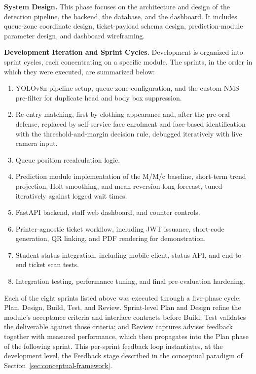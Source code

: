 \documentclass{research}
\begin{document}
\textbf{System Design.} This phase focuses on the architecture and
design of the detection pipeline, the backend, the database, and the
dashboard. It includes queue-zone coordinate design, ticket-payload
schema design, prediction-module parameter design, and dashboard
wireframing.

\textbf{Development Iteration and Sprint Cycles.} Development is
organized into sprint cycles, each concentrating on a specific module.
The sprints, in the order in which they were executed, are
summarized below:
\begin{enumerate}
  \item YOLOv8n pipeline setup, queue-zone configuration, and the
        custom NMS pre-filter for duplicate head and body box
        suppression.
  \item Re-entry matching, first by clothing appearance and, after the
        pre-oral defense, replaced by self-service face enrolment and
        face-based identification with the threshold-and-margin decision
        rule, debugged iteratively with live camera input.
  \item Queue position recalculation logic.
  \item Prediction module implementation of the M/M/c baseline,
        short-term trend projection, Holt smoothing, and
        mean-reversion long forecast, tuned iteratively against logged
        wait times.
  \item FastAPI backend, staff web dashboard, and counter controls.
  \item Printer-agnostic ticket workflow, including JWT issuance,
        short-code generation, QR linking, and PDF rendering for
        demonstration.
  \item Student status integration, including mobile client, status
        API, and end-to-end ticket scan tests.
  \item Integration testing, performance tuning, and final
        pre-evaluation hardening.
\end{enumerate}

Each of the eight sprints listed above was executed through a five-phase
cycle: Plan, Design, Build, Test, and Review. Sprint-level Plan and
Design refine the module's acceptance criteria and interface contracts
before Build; Test validates the deliverable against those criteria;
and Review captures adviser feedback together with measured performance,
which then propagates into the Plan phase of the following sprint.
This per-sprint feedback loop instantiates, at the development level,
the Feedback stage described in the conceptual paradigm of
Section~\ref{sec:conceptual-framework}.
\end{document}
